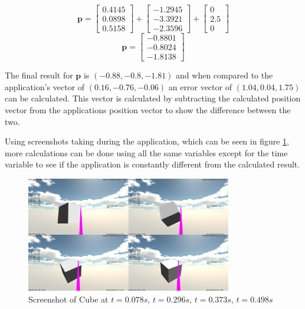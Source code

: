 \begin{equation}\label{eq:working2}
	\mathbf{p}=
	\begin{bmatrix}
		 0.4145  \\
		 0.0898  \\
		 0.5158 
	\end{bmatrix}
	+
	\begin{bmatrix}
		-1.2945 \\
		-3.3921 \\
		-2.3596 
	\end{bmatrix}
	+
	\begin{bmatrix}
		 0 \\
		 2.5 \\
		 0 
	\end{bmatrix}
\end{equation}
\begin{equation}\label{eq:final}
	\mathbf{p}=
	\begin{bmatrix}
		-0.8801 \\
 		-0.8024 \\
 		-1.8138 
	\end{bmatrix}
\end{equation}

The final result for $\mathbf{p}$ is $(-0.88,-0.8,-1.81)$ and when compared to the application's vector of $(0.16,-0.76,-0.06)$ an error vector of $(1.04,0.04,1.75)$ can be calculated.
This vector is calculated by subtracting the calculated position vector from the applications position vector to show the difference between the two.

Using screenshots taking during the application, which can be seen in figure \ref{fig:ScreenShotFour}, more calculations can be done using all the same variables except for the time variable to see if the application is constantly different from the calculated result.
\begin{figure}[h]
	\centering
	\includegraphics[width=0.8\textwidth]{images/Screenshot1.PNG}
	\caption{Screenshot of Cube at $t = 0.078 s$, $t = 0.296 s$, $t = 0.373 s$, $t = 0.498 s$}
	\label{fig:ScreenShotFour}
\end{figure}

